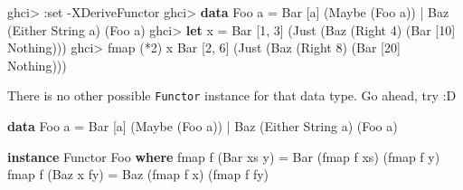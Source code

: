 \documentclass[]{article}
\newenvironment{Shaded}{}{}
\newcommand{\DataTypeTok}[1]{\textcolor[rgb]{0.56,0.13,0.00}{#1}}
\newcommand{\DecValTok}[1]{\textcolor[rgb]{0.25,0.63,0.44}{#1}}
\newcommand{\FunctionTok}[1]{\textcolor[rgb]{0.02,0.16,0.49}{#1}}
\newcommand{\KeywordTok}[1]{\textcolor[rgb]{0.00,0.44,0.13}{\textbf{#1}}}
\newcommand{\NormalTok}[1]{#1}
\newcommand{\OperatorTok}[1]{\textcolor[rgb]{0.40,0.40,0.40}{#1}}
\newcommand{\OtherTok}[1]{\textcolor[rgb]{0.00,0.44,0.13}{#1}}
\begin{document}
\begin{Shaded}
\begin{Highlighting}[]
\NormalTok{ghci}\OperatorTok{\textgreater{}} \OperatorTok{:}\NormalTok{set }\OperatorTok{{-}}\DataTypeTok{XDeriveFunctor}
\NormalTok{ghci}\OperatorTok{\textgreater{}} \KeywordTok{data} \DataTypeTok{Foo}\NormalTok{ a }\OtherTok{=} \DataTypeTok{Bar}\NormalTok{ [a] (}\DataTypeTok{Maybe}\NormalTok{ (}\DataTypeTok{Foo}\NormalTok{ a)) }\OperatorTok{|} \DataTypeTok{Baz}\NormalTok{ (}\DataTypeTok{Either} \DataTypeTok{String}\NormalTok{ a) (}\DataTypeTok{Foo}\NormalTok{ a)}
\NormalTok{ghci}\OperatorTok{\textgreater{}} \KeywordTok{let}\NormalTok{ x }\OtherTok{=} \DataTypeTok{Bar}\NormalTok{ [}\DecValTok{1}\NormalTok{, }\DecValTok{3}\NormalTok{] (}\DataTypeTok{Just}\NormalTok{ (}\DataTypeTok{Baz}\NormalTok{ (}\DataTypeTok{Right} \DecValTok{4}\NormalTok{) (}\DataTypeTok{Bar}\NormalTok{ [}\DecValTok{10}\NormalTok{] }\DataTypeTok{Nothing}\NormalTok{)))}
\NormalTok{ghci}\OperatorTok{\textgreater{}} \FunctionTok{fmap}\NormalTok{ (}\OperatorTok{*}\DecValTok{2}\NormalTok{) x}
\DataTypeTok{Bar}\NormalTok{ [}\DecValTok{2}\NormalTok{, }\DecValTok{6}\NormalTok{] (}\DataTypeTok{Just}\NormalTok{ (}\DataTypeTok{Baz}\NormalTok{ (}\DataTypeTok{Right} \DecValTok{8}\NormalTok{) (}\DataTypeTok{Bar}\NormalTok{ [}\DecValTok{20}\NormalTok{] }\DataTypeTok{Nothing}\NormalTok{)))}
\end{Highlighting}
\end{Shaded}

There is no other possible \texttt{Functor} instance for that data type. Go
ahead, try :D

\begin{Shaded}
\begin{Highlighting}[]
\KeywordTok{data} \DataTypeTok{Foo}\NormalTok{ a }\OtherTok{=} \DataTypeTok{Bar}\NormalTok{ [a] (}\DataTypeTok{Maybe}\NormalTok{ (}\DataTypeTok{Foo}\NormalTok{ a)) }\OperatorTok{|} \DataTypeTok{Baz}\NormalTok{ (}\DataTypeTok{Either} \DataTypeTok{String}\NormalTok{ a) (}\DataTypeTok{Foo}\NormalTok{ a)}

\KeywordTok{instance} \DataTypeTok{Functor} \DataTypeTok{Foo} \KeywordTok{where}
    \FunctionTok{fmap}\NormalTok{ f (}\DataTypeTok{Bar}\NormalTok{ xs y) }\OtherTok{=} \DataTypeTok{Bar}\NormalTok{ (}\FunctionTok{fmap}\NormalTok{ f xs) (}\FunctionTok{fmap}\NormalTok{ f y)}
    \FunctionTok{fmap}\NormalTok{ f (}\DataTypeTok{Baz}\NormalTok{ x fy) }\OtherTok{=} \DataTypeTok{Baz}\NormalTok{ (}\FunctionTok{fmap}\NormalTok{ f x) (}\FunctionTok{fmap}\NormalTok{ f fy)}
\end{Highlighting}
\end{Shaded}
\end{document}
